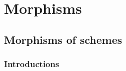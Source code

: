 \documentclass[11pt]{book} %
\begin{document}






\part{Morphisms}
\chapter{Morphisms of schemes}
\section{Introductions}
\end{document}
